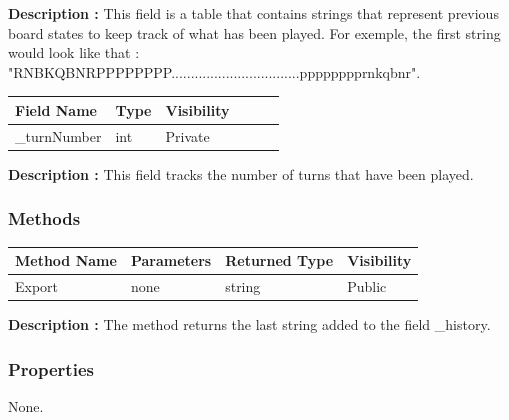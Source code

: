 \documentclass[12pt]{article}
\begin{document}
\textbf{Description :} This field is a table that contains strings that
represent previous board states to keep track of what has been played. For exemple,
the first string would look like that :
\\"RNBKQBNRPPPPPPPP.................................pppppppprnkqbnr". 

\begin{table}[H]
    \begin{tabular}{llllll}
    \hline
    \multicolumn{1}{|l|}{\cellcolor[HTML]{EFEFEF}\textbf{Field Name}} & \multicolumn{1}{l|}{\cellcolor[HTML]{EFEFEF}\textbf{Type}} & \multicolumn{1}{l|}{\cellcolor[HTML]{EFEFEF}\textbf{Visibility}} \\ \hline
    \multicolumn{1}{|l|}{\_turnNumber}                                & \multicolumn{1}{l|}{int}                                   & \multicolumn{1}{l|}{Private}                                     \\ \hline
    \end{tabular}
\end{table}

\textbf{Description :} This field tracks the number of turns that have been played.

\subsubsection{Methods}

\begin{table}[H]
    \begin{tabular}{|l|l|l|l|}
    \hline
    \rowcolor[HTML]{EFEFEF} 
    \cellcolor[HTML]{EFEFEF}\textbf{Method Name} & \textbf{Parameters}  & \textbf{Returned Type} & \textbf{Visibility} \\ \hline
    Export                                       & none                 & string                 & Public              \\ \hline
    \end{tabular}
\end{table}

\textbf{Description :} The method returns the last string added to the field \_history.

\subsubsection{Properties}

None.
\newpage
\end{document}
